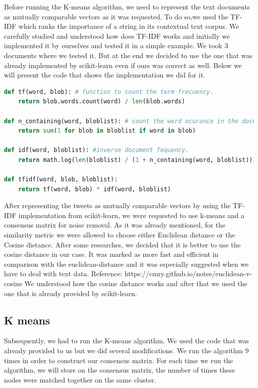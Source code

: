 \documentclass{article}
\begin{document}
Before running the K-means algorithm, we need to represent the text documents as mutually comparable vectors as it was requested. To do so,we used the TF-IDF which ranks the importance of a string in its contextual text corpus. We carefully studied and understood how does TF-IDF works and initially we implemented it by ourselves and tested it in a simple example. We took 3 documents where we tested it. But at the end we decided to use the one that was already implemented by scikit-learn even if ours was correct as well. Below we will present the code that shows the implementation we did for it. 

\begin{lstlisting}[language=Python, caption= TF-IDF implementation, label={lst:TF-IDF}]
def tf(word, blob): # function to count the term frecuency.
    return blob.words.count(word) / len(blob.words)

def n_containing(word, bloblist): # count the word ocurance in the document list.
    return sum(1 for blob in bloblist if word in blob)

def idf(word, bloblist): #inverse document fequency.
    return math.log(len(bloblist) / (1 + n_containing(word, bloblist)))

def tfidf(word, blob, bloblist):
    return tf(word, blob) * idf(word, bloblist)
           \end{lstlisting}

After representing the tweets as mutually comparable vectors by using the TF-IDF implementation from scikit-learn, we were requested to use k-means and a consensus matrix for noise removal. As it was already mentioned, for the similarity metric we were allowed to choose either Euclidean distance or the Cosine distance. After some researches, we decided that it is better to use the cosine distance in our case. It was marked as more fast and efficient in comparison with the euclidean-distance and it was especially suggested when we have to deal with text data. Reference: https://cmry.github.io/notes/euclidean-v-cosine
We understood how the cosine distance works and after that we used the one that is already provided by scikit-learn. 

\subsection{K means}

Subsequently, we had to run the K-means algorithm. We used the code that was already provided to us but we did several modifications. We run the algorithm 9 times in order to construct our consensus matrix. For each time we run the algorithm, we will store on the consensus matrix, the number of times these nodes were matched together on the same cluster.
\end{document}
